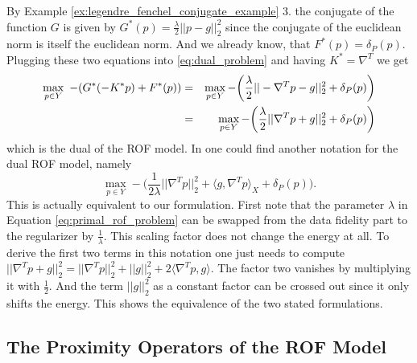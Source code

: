         By Example \ref{ex:legendre_fenchel_conjugate_example} 3. the conjugate of the function $G$ is given by $G^{\ast}(p) = \frac{\lambda}{2}||p - g||_{2}^{2}$ since the conjugate of the euclidean norm is itself the euclidean norm. And we already know, that $F^{\ast}(p) = \delta_{P}(p)$. Plugging these two equations into \ref{eq:dual_problem} and having $K^{\ast} = \nabla^{T}$ we get
            \begin{eqnarray}
                \max_{p \in Y}\,\, -(G^{\ast}(-K^{\ast}p) + F^{\ast}(p)) &=& \max_{p \in Y} -\bigg( \frac{\lambda}{2}||-\nabla^{T}p - g||_{2}^{2} + \delta_{P}(p) \bigg) \notag \\
                &=& \max_{p \in Y} -\bigg( \frac{\lambda}{2}||\nabla^{T}p + g||_{2}^{2} + \delta_{P}(p) \bigg)
            \label{eq:dual_rof_problem}
            \end{eqnarray}
        which is the dual of the ROF model. In \cite{Chambolle10afirst-order} one could find another notation for the dual ROF model, namely
            $$
                \max_{p \in Y} - \bigg( \frac{1}{2\lambda} ||\nabla^{T}p||^{2}_{2} + \langle g, \nabla^{T}p \rangle_{X} + \delta_{P}(p) \bigg).
            $$
        This is actually equivalent to our formulation. First note that the parameter $\lambda$ in Equation \ref{eq:primal_rof_problem} can be swapped from the data fidelity part to the regularizer by $\frac{1}{\lambda}$. This scaling factor does not change the energy at all. To derive the first two terms in this notation one just needs to compute $||\nabla^{T}p + g||_{2}^{2} = ||\nabla^{T}p||_{2}^{2} + ||g||_{2}^{2} + 2 \langle \nabla^{T}p, g \rangle$. The factor two vanishes by multiplying it with $\frac{1}{2}$. And the term $||g||_{2}^{2}$ as a constant factor can be crossed out since it only shifts the energy. This shows the equivalence of the two stated formulations.


    \subsection{The Proximity Operators of the ROF Model} %
    \label{sub:the_proximity_operators_for_the_rof_model}

